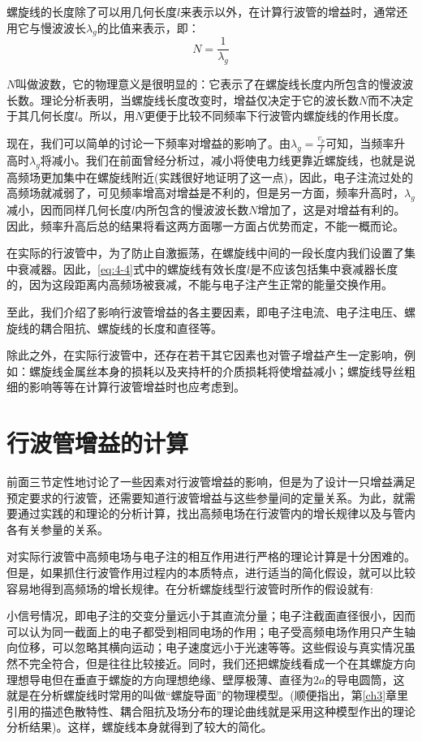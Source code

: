  
 螺旋线的长度除了可以用几何长度$ l $来表示以外，在计算行波管的增益时，通常还用它与慢波波长$ \lambda_g $的比值来表示，即：
\begin{equation} \label{eq:4-4}
	N = \frac{1}{\lambda_g}
\end{equation}
  
$ N $叫做波数，它的物理意义是很明显的：它表示了在螺旋线长度内所包含的慢波波长数。理论分析表明，当螺旋线长度改变时，增益仅决定于它的波长数$ N $而不决定于其几何长度$ l $。所以，用$ N $更便于比较不同频率下行波管内螺旋线的作用长度。

现在，我们可以简单的讨论一下频率对增益的影响了。由$ \lambda_g = \frac{v_p}{f} $可知，当频率升高时$ \lambda_g $将减小。我们在前面曾经分析过，减小将使电力线更靠近螺旋线，也就是说高频场更加集中在螺旋线附近(实践很好地证明了这一点)，因此，电子注流过处的高频场就减弱了，可见频率增高对增益是不利的，但是另一方面，频率升高时，$ \lambda_g $减小，因而同样几何长度$ l $内所包含的慢波波长数$ N $增加了，这是对增益有利的。因此，频率升高后总的结果将看这两方面哪一方面占优势而定，不能一概而论。

在实际的行波管中，为了防止自激振荡，在螺旋线中间的一段长度内我们设置了集中衰减器。因此，\eqref{eq:4-4}式中的螺旋线有效长度$ l $是不应该包括集中衰减器长度的，因为这段距离内高频场被衰减，不能与电子注产生正常的能量交换作用。

至此，我们介绍了影响行波管增益的各主要因素，即电子注电流、电子注电压、螺旋线的耦合阻抗、螺旋线的长度和直径等。

除此之外，在实际行波管中，还存在若干其它因素也对管子增益产生一定影响，例如：螺旋线金属丝本身的损耗以及夹持杆的介质损耗将使增益减小；螺旋线导丝粗细的影响等等在计算行波管增益时也应考虑到。
 
\section{行波管增益的计算} 


前面三节定性地讨论了一些因素对行波管增益的影响，但是为了设计一只增益满足预定要求的行波管，还需要知道行波管增益与这些参量间的定量关系。为此，就需要通过实践的和理论的分析计算，找出高频电场在行波管内的增长规律以及与管内各有关参量的关系。


对实际行波管中高频电场与电子注的相互作用进行严格的理论计算是十分困难的。但是，如果抓住行波管作用过程内的本质特点，进行适当的简化假设，就可以比较容易地得到高频场的增长规律。在分析螺旋线型行波管时所作的假设就有:


小信号情况，即电子注的交变分量远小于其直流分量；电子注截面直径很小，因而可以认为同一截面上的电子都受到相同电场的作用；电子受高频电场作用只产生轴向位移，可以忽略其横向运动；电子速度远小于光速等等。这些假设与真实情况虽然不完全符合，但是往往比较接近。同时，我们还把螺旋线看成一个在其螺旋方向理想导电但在垂直于螺旋的方向理想绝缘、壁厚极薄、直径为$ 2a $的导电圆筒，这就是在分析螺旋线时常用的叫做“螺旋导面”的物理模型。(顺便指出，第\ref{ch3}章里引用的描述色散特性、耦合阻抗及场分布的理论曲线就是采用这种模型作出的理论分析结果)。这样，螺旋线本身就得到了较大的简化。


